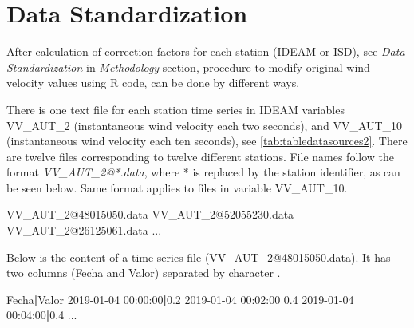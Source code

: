 \documentclass[12pt,oneside]{reedthesis}
\newenvironment{Shaded}{\begin{snugshade}}{\end{snugshade}}
\newcommand{\ExtensionTok}[1]{#1}
\newcommand{\KeywordTok}[1]{\textcolor[rgb]{0.13,0.29,0.53}{\textbf{#1}}}
\newcommand{\NormalTok}[1]{#1}
\begin{document}
\hypertarget{data-standardization-1}{%
\section{Data Standardization}\label{data-standardization-1}}

After calculation of correction factors for each station (IDEAM or ISD), see \emph{\protect\hyperlink{rmd-standardization}{Data Standardization}} in \emph{\protect\hyperlink{rmd-method}{Methodology}} section, procedure to modify original wind velocity values using R code, can be done by different ways.

There is one text file for each station time series in IDEAM variables VV\_AUT\_2 (instantaneous wind velocity each two seconds), and VV\_AUT\_10 (instantaneous wind velocity each ten seconds), see \ref{tab:tabledatasources2}. There are twelve files corresponding to twelve different stations. File names follow the format \emph{VV\_AUT\_2@*.data}, where * is replaced by the station identifier, as can be seen below. Same format applies to files in variable VV\_AUT\_10.

\scriptsize

\vspace{0.4cm}
\begin{Shaded}
\begin{Highlighting}[]
      \ExtensionTok{VV_AUT_2@48015050.data}
      \ExtensionTok{VV_AUT_2@52055230.data}
      \ExtensionTok{VV_AUT_2@26125061.data}
      \ExtensionTok{...}
\end{Highlighting}
\end{Shaded}
\normalsize

Below is the content of a time series file (VV\_AUT\_2@48015050.data). It has two columns (Fecha and Valor) separated by character \textbar.

\scriptsize

\vspace{0.4cm}
\begin{Shaded}
\begin{Highlighting}[]
      \ExtensionTok{Fecha}\KeywordTok{|}\ExtensionTok{Valor}
      \ExtensionTok{2019-01-04}\NormalTok{ 00:00:00}\KeywordTok{|}\ExtensionTok{0.2}
      \ExtensionTok{2019-01-04}\NormalTok{ 00:02:00}\KeywordTok{|}\ExtensionTok{0.4}
      \ExtensionTok{2019-01-04}\NormalTok{ 00:04:00}\KeywordTok{|}\ExtensionTok{0.4}
      \ExtensionTok{...}
\end{Highlighting}
\end{Shaded}
\normalsize
\end{document}
